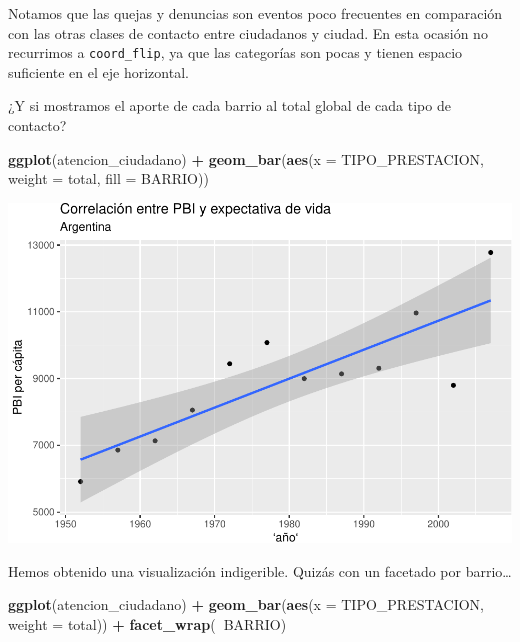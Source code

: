 \documentclass[]{book}
\newenvironment{Shaded}{\begin{snugshade}}{\end{snugshade}}
\newcommand{\KeywordTok}[1]{\textcolor[rgb]{0.13,0.29,0.53}{\textbf{#1}}}
\newcommand{\DataTypeTok}[1]{\textcolor[rgb]{0.13,0.29,0.53}{#1}}
\newcommand{\StringTok}[1]{\textcolor[rgb]{0.31,0.60,0.02}{#1}}
\newcommand{\OperatorTok}[1]{\textcolor[rgb]{0.81,0.36,0.00}{\textbf{#1}}}
\newcommand{\NormalTok}[1]{#1}
\begin{document}
Notamos que las quejas y denuncias son eventos poco frecuentes en
comparación con las otras clases de contacto entre ciudadanos y ciudad.
En esta ocasión no recurrimos a \texttt{coord\_flip}, ya que las
categorías son pocas y tienen espacio suficiente en el eje horizontal.

¿Y si mostramos el aporte de cada barrio al total global de cada tipo de
contacto?

\begin{Shaded}
\begin{Highlighting}[]
\KeywordTok{ggplot}\NormalTok{(atencion_ciudadano) }\OperatorTok{+}
\StringTok{    }\KeywordTok{geom_bar}\NormalTok{(}\KeywordTok{aes}\NormalTok{(}\DataTypeTok{x =}\NormalTok{ TIPO_PRESTACION, }\DataTypeTok{weight =}\NormalTok{ total, }\DataTypeTok{fill =}\NormalTok{ BARRIO)) }
\end{Highlighting}
\end{Shaded}

\includegraphics{ciencia_de_datos_politicas_publicas_files/figure-latex/unnamed-chunk-98-1.pdf}

Hemos obtenido una visualización indigerible. Quizás con un facetado por
barrio\ldots{}

\begin{Shaded}
\begin{Highlighting}[]
\KeywordTok{ggplot}\NormalTok{(atencion_ciudadano) }\OperatorTok{+}
\StringTok{    }\KeywordTok{geom_bar}\NormalTok{(}\KeywordTok{aes}\NormalTok{(}\DataTypeTok{x =}\NormalTok{ TIPO_PRESTACION, }\DataTypeTok{weight =}\NormalTok{ total)) }\OperatorTok{+}
\StringTok{    }\KeywordTok{facet_wrap}\NormalTok{(}\OperatorTok{~}\NormalTok{BARRIO)}
\end{Highlighting}
\end{Shaded}
\end{document}
